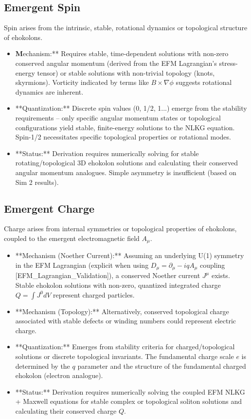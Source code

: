 \documentclass[11pt]{article}
\begin{document}
\subsection{Emergent Spin}
Spin arises from the intrinsic, stable, rotational dynamics or topological structure of ehokolons.
\begin{itemize}
    \item \textbf Mechanism:** Requires stable, time-dependent solutions with non-zero conserved angular momentum (derived from the EFM Lagrangian's stress-energy tensor) or stable solutions with non-trivial topology (knots, skyrmions). Vorticity indicated by terms like \(B \times \nabla \phi\) suggests rotational dynamics are inherent.
    \item **Quantization:** Discrete spin values (0, 1/2, 1...) emerge from the stability requirements – only specific angular momentum states or topological configurations yield stable, finite-energy solutions to the NLKG equation. Spin-1/2 necessitates specific topological properties or rotational modes.
    \item **Status:** Derivation requires numerically solving for stable rotating/topological 3D ehokolon solutions and calculating their conserved angular momentum analogues. Simple asymmetry is insufficient (based on Sim 2 results).
\end{itemize}

\subsection{Emergent Charge}
Charge arises from internal symmetries or topological properties of ehokolons, coupled to the emergent electromagnetic field \(A_\mu\).
\begin{itemize}
    \item **Mechanism (Noether Current):** Assuming an underlying U(1) symmetry in the EFM Lagrangian (explicit when using \(D_\mu = \partial_\mu - iqA_\mu\) coupling [EFM\_Lagrangian\_Validation]), a conserved Noether current \(J^\mu\) exists. Stable ehokolon solutions with non-zero, quantized integrated charge \(Q = \int J^0 dV\) represent charged particles.
    \item **Mechanism (Topology):** Alternatively, conserved topological charge associated with stable defects or winding numbers could represent electric charge.
    \item **Quantization:** Emerges from stability criteria for charged/topological solutions or discrete topological invariants. The fundamental charge scale \(e\) is determined by the \(q\) parameter and the structure of the fundamental charged ehokolon (electron analogue).
    \item **Status:** Derivation requires numerically solving the coupled EFM NLKG + Maxwell equations for stable complex or topological soliton solutions and calculating their conserved charge \(Q\).
\end{itemize}
\end{document}
